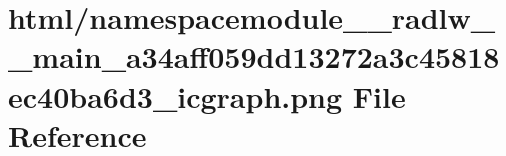 \hypertarget{namespacemodule____radlw____main__a34aff059dd13272a3c45818ec40ba6d3__icgraph_8png}{}\section{html/namespacemodule\+\_\+\+\_\+radlw\+\_\+\+\_\+main\+\_\+a34aff059dd13272a3c45818ec40ba6d3\+\_\+icgraph.png File Reference}
\label{namespacemodule____radlw____main__a34aff059dd13272a3c45818ec40ba6d3__icgraph_8png}

